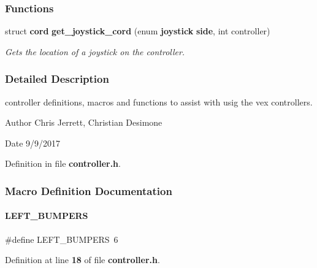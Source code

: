 \subsubsection*{Functions}
\begin{DoxyCompactItemize}
\item 
struct \textbf{ cord} \textbf{ get\+\_\+joystick\+\_\+cord} (enum \textbf{ joystick} \textbf{ side}, int controller)
\begin{DoxyCompactList}\small\item\em Gets the location of a joystick on the controller. \end{DoxyCompactList}\end{DoxyCompactItemize}


\subsubsection{Detailed Description}
controller definitions, macros and functions to assist with usig the vex controllers. 

\begin{DoxyAuthor}{Author}
Chris Jerrett, Christian Desimone 
\end{DoxyAuthor}
\begin{DoxyDate}{Date}
9/9/2017 
\end{DoxyDate}


Definition in file \textbf{ controller.\+h}.



\subsubsection{Macro Definition Documentation}
\mbox{\label{controller_8h_ad61eb6d28a76985afb8d39ef925541bb}} 
\paragraph{L\+E\+F\+T\+\_\+\+B\+U\+M\+P\+E\+RS}
{\footnotesize\ttfamily \#define L\+E\+F\+T\+\_\+\+B\+U\+M\+P\+E\+RS~6}



Definition at line \textbf{ 18} of file \textbf{ controller.\+h}.

\mbox{\label{controller_8h_a9b885de9f143efd0c862ceb054256536}} 
